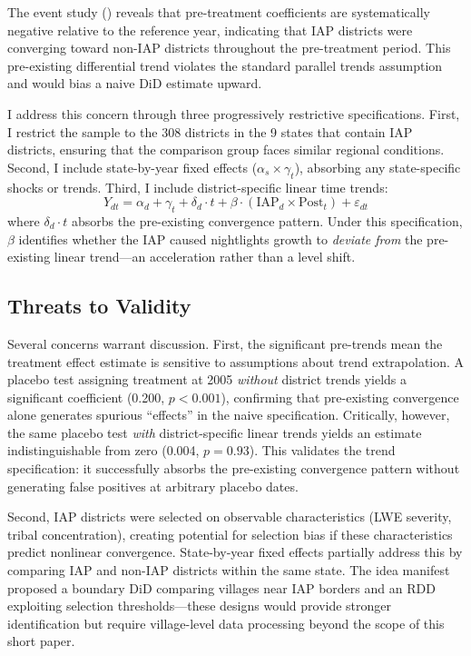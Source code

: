 \documentclass[12pt]{article}
\begin{document}
The event study () reveals that pre-treatment coefficients are systematically negative relative to the reference year, indicating that IAP districts were converging toward non-IAP districts throughout the pre-treatment period. This pre-existing differential trend violates the standard parallel trends assumption and would bias a naive DiD estimate upward.

I address this concern through three progressively restrictive specifications. First, I restrict the sample to the 308 districts in the 9 states that contain IAP districts, ensuring that the comparison group faces similar regional conditions. Second, I include state-by-year fixed effects ($\alpha_s \times \gamma_t$), absorbing any state-specific shocks or trends. Third, I include district-specific linear time trends:
\begin{equation}
Y_{dt} = \alpha_d + \gamma_t + \delta_d \cdot t + \beta \cdot (\text{IAP}_d \times \text{Post}_t) + \varepsilon_{dt}
\label{eq:trends}
\end{equation}
where $\delta_d \cdot t$ absorbs the pre-existing convergence pattern. Under this specification, $\beta$ identifies whether the IAP caused nightlights growth to \textit{deviate from} the pre-existing linear trend---an acceleration rather than a level shift.

\subsection{Threats to Validity}

Several concerns warrant discussion. First, the significant pre-trends mean the treatment effect estimate is sensitive to assumptions about trend extrapolation. A placebo test assigning treatment at 2005 \textit{without} district trends yields a significant coefficient (0.200, $p < 0.001$), confirming that pre-existing convergence alone generates spurious ``effects'' in the naive specification. Critically, however, the same placebo test \textit{with} district-specific linear trends yields an estimate indistinguishable from zero (0.004, $p = 0.93$). This validates the trend specification: it successfully absorbs the pre-existing convergence pattern without generating false positives at arbitrary placebo dates.

Second, IAP districts were selected on observable characteristics (LWE severity, tribal concentration), creating potential for selection bias if these characteristics predict nonlinear convergence. State-by-year fixed effects partially address this by comparing IAP and non-IAP districts within the same state. The idea manifest proposed a boundary DiD comparing villages near IAP borders and an RDD exploiting selection thresholds---these designs would provide stronger identification but require village-level data processing beyond the scope of this short paper.
\end{document}
